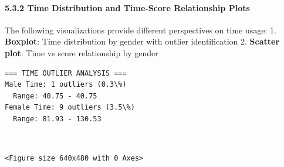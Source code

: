 \documentclass[11pt]{article}
\begin{document}
    \paragraph{5.3.2 Time Distribution and Time-Score Relationship
Plots}\label{time-distribution-and-time-score-relationship-plots}

The following visualizations provide different perspectives on time
usage: 1. \textbf{Boxplot}: Time distribution by gender with outlier
identification 2. \textbf{Scatter plot}: Time vs score relationship by
gender

    \begin{Verbatim}[commandchars=\\\{\}]
=== TIME OUTLIER ANALYSIS ===
Male Time: 1 outliers (0.3\%)
  Range: 40.75 - 40.75
Female Time: 9 outliers (3.5\%)
  Range: 81.93 - 130.53
    \end{Verbatim}

    \begin{center}
    \end{center}
    { \hspace*{\fill} \\}
    
    
    \begin{Verbatim}[commandchars=\\\{\}]
<Figure size 640x480 with 0 Axes>
    \end{Verbatim}

    

    
    
    
\end{document}
